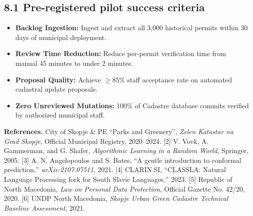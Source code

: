 \documentclass[9pt,a4paper]{article}
\begin{document}
\vspace{0.2em}
\subsection*{8.1 Pre-registered pilot success criteria}
\begin{itemize}[leftmargin=1.4em, itemsep=0.02em]
  \item \textbf{Backlog Ingestion:} Ingest and extract all 3,000 historical permits within 30 days of municipal deployment.
  \item \textbf{Review Time Reduction:} Reduce per-permit verification time from manual 45 minutes to under 2 minutes.
  \item \textbf{Proposal Quality:} Achieve $\ge 85\%$ staff acceptance rate on automated cadastral update proposals.
  \item \textbf{Zero Unreviewed Mutations:} 100\% of Cadastre database commits verified by authorized municipal staff.
\end{itemize}

\vspace{0.2em}
\textsf{\textbf{\fontsize{7.5pt}{9pt}\selectfont References.}}
\fontsize{7.5pt}{9pt}\selectfont
[1] City of Skopje \& PE ``Parks and Greenery'', \textit{Zelen Katastar na Grad Skopje}, Official Municipal Registry, 2020--2024.
[2] V. Vovk, A. Gammerman, and G. Shafer, \textit{Algorithmic Learning in a Random World}, Springer, 2005.
[3] A. N. Angelopoulos and S. Bates, ``A gentle introduction to conformal prediction,'' \textit{arXiv:2107.07511}, 2021.
[4] CLARIN.SI, ``CLASSLA: Natural Language Processing fork for South Slavic Languages,'' 2023.
[5] Republic of North Macedonia, \textit{Law on Personal Data Protection}, Official Gazette No. 42/20, 2020.
[6] UNDP North Macedonia, \textit{Skopje Urban Green Cadastre Technical Baseline Assessment}, 2021.
\end{document}
